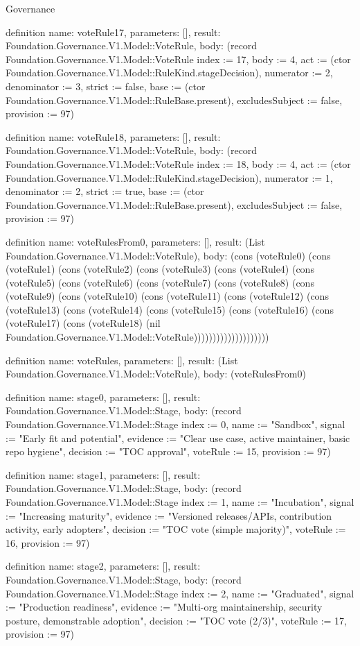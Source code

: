 \begin{lexlean}{Governance}
\begin{semanticmodule}
definition{
  name: voteRule17,
  parameters: [],
  result: Foundation.Governance.V1.Model::VoteRule,
  body: (record Foundation.Governance.V1.Model::VoteRule {index := 17, body := 4, act := (ctor Foundation.Governance.V1.Model::RuleKind.stageDecision), numerator := 2, denominator := 3, strict := false, base := (ctor Foundation.Governance.V1.Model::RuleBase.present), excludesSubject := false, provision := 97})
}

definition{
  name: voteRule18,
  parameters: [],
  result: Foundation.Governance.V1.Model::VoteRule,
  body: (record Foundation.Governance.V1.Model::VoteRule {index := 18, body := 4, act := (ctor Foundation.Governance.V1.Model::RuleKind.stageDecision), numerator := 1, denominator := 2, strict := true, base := (ctor Foundation.Governance.V1.Model::RuleBase.present), excludesSubject := false, provision := 97})
}

definition{
  name: voteRulesFrom0,
  parameters: [],
  result: (List Foundation.Governance.V1.Model::VoteRule),
  body: (cons (voteRule0) (cons (voteRule1) (cons (voteRule2) (cons (voteRule3) (cons (voteRule4) (cons (voteRule5) (cons (voteRule6) (cons (voteRule7) (cons (voteRule8) (cons (voteRule9) (cons (voteRule10) (cons (voteRule11) (cons (voteRule12) (cons (voteRule13) (cons (voteRule14) (cons (voteRule15) (cons (voteRule16) (cons (voteRule17) (cons (voteRule18) (nil Foundation.Governance.V1.Model::VoteRule))))))))))))))))))))
}

definition{
  name: voteRules,
  parameters: [],
  result: (List Foundation.Governance.V1.Model::VoteRule),
  body: (voteRulesFrom0)
}

definition{
  name: stage0,
  parameters: [],
  result: Foundation.Governance.V1.Model::Stage,
  body: (record Foundation.Governance.V1.Model::Stage {index := 0, name := "Sandbox", signal := "Early fit and potential", evidence := "Clear use case, active maintainer, basic repo hygiene", decision := "TOC approval", voteRule := 15, provision := 97})
}

definition{
  name: stage1,
  parameters: [],
  result: Foundation.Governance.V1.Model::Stage,
  body: (record Foundation.Governance.V1.Model::Stage {index := 1, name := "Incubation", signal := "Increasing maturity", evidence := "Versioned releases/APIs, contribution activity, early adopters", decision := "TOC vote (simple majority)", voteRule := 16, provision := 97})
}

definition{
  name: stage2,
  parameters: [],
  result: Foundation.Governance.V1.Model::Stage,
  body: (record Foundation.Governance.V1.Model::Stage {index := 2, name := "Graduated", signal := "Production readiness", evidence := "Multi-org maintainership, security posture, demonstrable adoption", decision := "TOC vote (2/3)", voteRule := 17, provision := 97})
}


\end{semanticmodule}
\end{lexlean}
